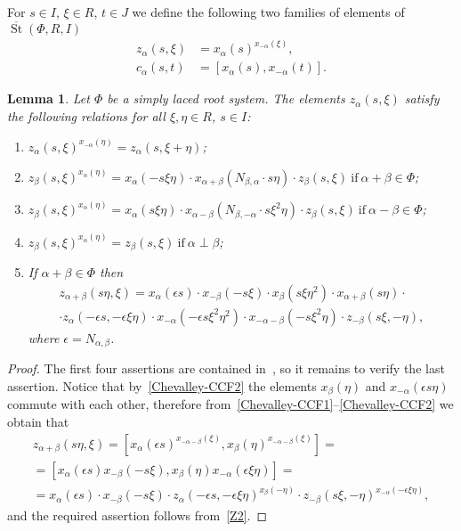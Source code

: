 \documentclass[10pt,a4paper,twoside]{article}
\newtheorem{lemma}{Lemma}
\theoremstyle{remark}
\theoremstyle{definition}
\numberwithin{lemma}{section}
\numberwithin{prop}{section}
\numberwithin{corollary}{section}
\numberwithin{externaltheorem}{section}
\DeclareMathOperator{\St}{St}
\numberwithin{equation}{section}
\begin{document}
For $s\in I$, $\xi \in R$, $t \in J$ we define the following two families of elements of $\overline{\St}(\Phi, R, I)$ 
\begin{align}
 z_\alpha(s, \xi) &= x_\alpha(s)^{x_{-\alpha}(\xi)}, \label{Zdef}\\
 c_\alpha(s, t)   &= [x_\alpha(s), x_{-\alpha}(t)]. \label{Cdef}
\end{align}

\begin{lemma}\label{Zrels} Let $\Phi$ be a simply laced root system.
The elements $z_\alpha(s, \xi)$ satisfy the following relations for all $\xi, \eta\in R$, $s\in I$:
\begin{enumerate} [label=\normalfont(\arabic*)]
\item\label{Z1} $z_{\alpha}(s, \xi) ^ {x_{-\alpha}(\eta)} = z_{\alpha}(s, \xi + \eta)$;
\item\label{Z2} $z_{\beta}(s, \xi) ^ {x_{\alpha}(\eta)} = x_{\alpha} (- s\xi \eta) \cdot x_{\alpha+\beta} (N_{\beta, \alpha}\cdot s\eta)     \cdot z_{\beta}(s, \xi)\ \text{if}\ \alpha + \beta \in \Phi$;
\item\label{Z3} $z_{\beta}(s, \xi) ^ {x_{\alpha}(\eta)} = x_{\alpha} (s\xi \eta) \cdot x_{\alpha-\beta} (N_{\beta,-\alpha}\cdot s\xi^2\eta) \cdot z_{\beta}(s, \xi)\ \text{if}\ \alpha - \beta \in \Phi$;

\item\label{Z4} $z_{\beta}(s, \xi) ^ {x_{\alpha}(\eta)} = z_{\beta}(s, \xi)\ \text{if}\ \alpha\perp\beta$;
\item\label{Z5} If $\alpha+\beta\in\Phi$ then
\begin{multline*} z_{\alpha+\beta}(s\eta, \xi) = x_\alpha(\epsilon s)\cdot x_{-\beta}(-s\xi) \cdot x_{\beta}(s\xi\eta^2) \cdot x_{\alpha+\beta}(s \eta) \cdot \\ \cdot z_\alpha(-\epsilon s, -\epsilon \xi\eta) \cdot
  x_{-\alpha}(-\epsilon s\xi^2\eta^2) \cdot x_{-\alpha-\beta}(- s \xi^2 \eta) \cdot z_{-\beta}(s\xi, -\eta),\end{multline*}
 where $\epsilon = N_{\alpha,\beta}$.
\end{enumerate} \end{lemma}
\begin{proof}
The first four assertions are contained in~\cite[Lemma~9]{S15}, so it remains to verify the last assertion.
Notice that by~\eqref{Chevalley-CCF2} the elements $x_\beta(\eta)$ and $x_{-\alpha}(\epsilon s \eta)$ commute with each other, therefore from~\eqref{Chevalley-CCF1}--\eqref{Chevalley-CCF2} we obtain that
\begin{multline} \nonumber
  z_{\alpha+\beta}(s\eta, \xi) = [x_\alpha(\epsilon s)^{x_{-\alpha-\beta}(\xi)}, x_\beta(\eta)^{x_{-\alpha-\beta}(\xi)}] = \\
  = [x_\alpha(\epsilon s) x_{-\beta}(-s\xi), x_{\beta}(\eta) x_{-\alpha}(\epsilon \xi\eta)] = \\ 
  = x_\alpha(\epsilon s) \cdot x_{-\beta}(-s\xi) \cdot z_\alpha(-\epsilon s, -\epsilon \xi\eta)^{x_{\beta}(-\eta)} \cdot z_{-\beta}(s\xi, -\eta)^{x_{-\alpha}(-\epsilon \xi\eta)},
\end{multline} 
and the required assertion follows from~\ref{Z2}.
\end{proof}
\end{document}
